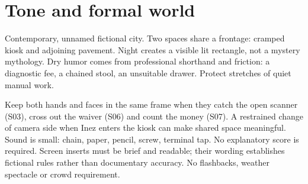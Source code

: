 \section{Tone and formal world}
Contemporary, unnamed fictional city. Two spaces share a frontage: cramped kiosk and adjoining pavement. Night creates a visible lit rectangle, not a mystery mythology. Dry humor comes from professional shorthand and friction: a diagnostic fee, a chained stool, an unsuitable drawer. Protect stretches of quiet manual work.

Keep both hands and faces in the same frame when they catch the open scanner (S03), cross out the waiver (S06) and count the money (S07). A restrained change of camera side when Inez enters the kiosk can make shared space meaningful. Sound is small: chain, paper, pencil, screw, terminal tap. No explanatory score is required. Screen inserts must be brief and readable; their wording establishes fictional rules rather than documentary accuracy. No flashbacks, weather spectacle or crowd requirement.
